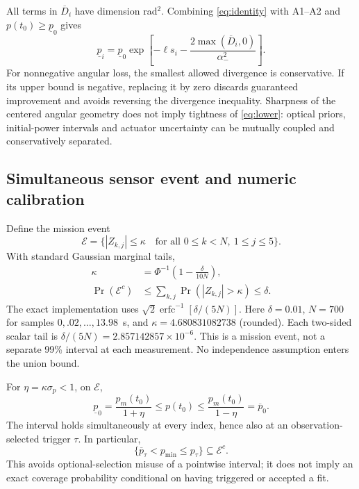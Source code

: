 All terms in $\overline D_i$ have dimension rad$^2$. Combining \eqref{eq:identity} with A1--A2 and $p(t_0)\geq\underline p_0$ gives
\begin{equation}
\underline p_i=\underline p_0\exp\left[-\ell s_i-
\frac{2\max(\overline D_i,0)}{\alpha_-^2}\right].
\label{eq:lower}
\end{equation}
For nonnegative angular loss, the smallest allowed divergence is conservative. If its upper bound is negative, replacing it by zero discards guaranteed improvement and avoids reversing the divergence inequality. Sharpness of the centered angular geometry does not imply tightness of \eqref{eq:lower}: optical priors, initial-power intervals and actuator uncertainty can be mutually coupled and conservatively separated.

\subsection{Simultaneous sensor event and numeric calibration}
Define the mission event
\begin{equation}
\mathcal E=\{ |Z_{k,j}|\leq\kappa\quad\text{for all }0\leq k<N,\ 1\leq j\leq5\}.
\end{equation}
With standard Gaussian marginal tails,
\begin{align}
\kappa&=\Phi^{-1}\!\left(1-\frac{\delta}{10N}\right),\nonumber\\
\Pr(\mathcal E^c)&\leq\sum_{k,j}\Pr(|Z_{k,j}|>\kappa)\leq\delta.
\label{eq:event}
\end{align}
The exact implementation uses $\sqrt2\operatorname{erfc}^{-1}[\delta/(5N)]$. Here $\delta=0.01$, $N=700$ for samples $0,.02,\ldots,13.98$~s, and $\kappa=4.680831082738$ (rounded). Each two-sided scalar tail is $\delta/(5N)=2.857142857\times10^{-6}$. This is a mission event, not a separate 99\% interval at each measurement. No independence assumption enters the union bound.

For $\eta=\kappa\sigma_p<1$, on $\mathcal E$,
\begin{equation}
\underline p_0=\frac{p_m(t_0)}{1+\eta}\leq p(t_0)\leq
\frac{p_m(t_0)}{1-\eta}=\overline p_0.
\label{eq:interval}
\end{equation}
The interval holds simultaneously at every index, hence also at an observation-selected trigger $\tau$. In particular,
\begin{equation}
\{\overline p_\tau<p_{\min}\leq p_\tau\}\subseteq\mathcal E^c.
\label{eq:falseenable}
\end{equation}
This avoids optional-selection misuse of a pointwise interval; it does not imply an exact coverage probability conditional on having triggered or accepted a fit.

